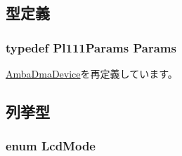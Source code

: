\subsection{型定義}
\hypertarget{classPl111_a98df8e62be26dfc2009a7e53d5d0841d}{
\subsubsection[{Params}]{\setlength{\rightskip}{0pt plus 5cm}typedef Pl111Params {\bf Params}}}
\label{classPl111_a98df8e62be26dfc2009a7e53d5d0841d}


\hyperlink{classAmbaDmaDevice_ab612ceb7381438552927b7ed0aed5099}{AmbaDmaDevice}を再定義しています。

\subsection{列挙型}
\hypertarget{classPl111_a1157b0263169abac7d7eab00e80cca3a}{
\subsubsection[{LcdMode}]{\setlength{\rightskip}{0pt plus 5cm}enum {\bf LcdMode}}}
\label{classPl111_a1157b0263169abac7d7eab00e80cca3a}
